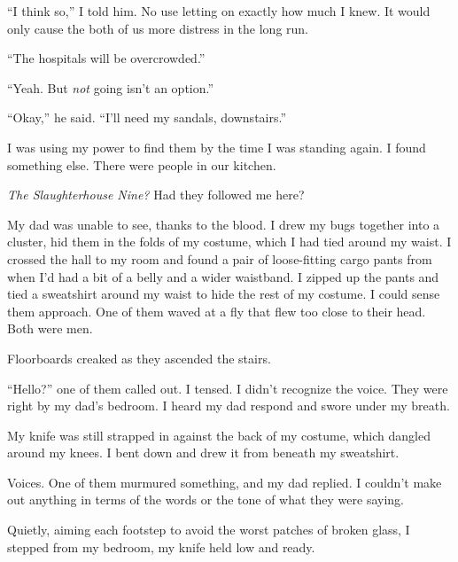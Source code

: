 ``I think so,'' I told him.  No use letting on exactly how much I knew.  It would only cause the both of us more distress in the long run.



``The hospitals will be overcrowded.''



``Yeah.  But \emph{not} going isn't an option.''



``Okay,'' he said.  ``I'll need my sandals, downstairs.''



I was using my power to find them by the time I was standing again.  I found something else.  There were people in our kitchen.



\emph{The Slaughterhouse Nine?  }Had they followed me here?



My dad was unable to see, thanks to the blood.  I drew my bugs together into a cluster, hid them in the folds of my costume, which I had tied around my waist.  I crossed the hall to my room and found a pair of loose-fitting cargo pants from when I'd had a bit of a belly and a wider waistband.  I zipped up the pants and tied a sweatshirt around my waist to hide the rest of my costume.  I could sense them approach.  One of them waved at a fly that flew too close to their head.  Both were men.



Floorboards creaked as they ascended the stairs.



``Hello?'' one of them called out.  I tensed.  I didn't recognize the voice.  They were right by my dad's bedroom.  I heard my dad respond and swore under my breath.



My knife was still strapped in against the back of my costume, which dangled around my knees.  I bent down and drew it from beneath my sweatshirt.



Voices.  One of them murmured something, and my dad replied.  I couldn't make out anything in terms of the words or the tone of what they were saying.



Quietly, aiming each footstep to avoid the worst patches of broken glass, I stepped from my bedroom, my knife held low and ready.



